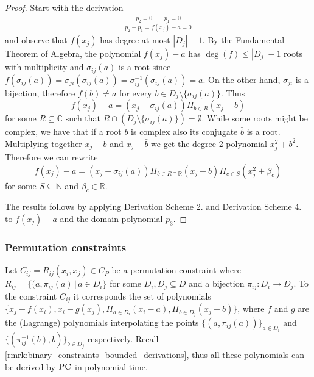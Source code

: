 \documentclass[11pt]{article}
\newcommand{\PC}{\textsc{PC}}
\newcommand{\1}{\textbf{1}}
\begin{document}
\begin{proof}
    Start with the derivation
    \begin{align*}
        \frac{p_2 = 0 \qquad  p_1 = 0}{p_2 - p_1 = f(x_j) - a = 0}
    \end{align*}
    and observe that $f(x_j)$ has degree at most $|D_j| - 1$. By the Fundamental Theorem of Algebra, the polynomial $f(x_j) - a$ has $\deg(f) \leq |D_j| - 1$ roots with multiplicity and $\sigma_{ij}(a)$ is a root since $f(\sigma_{ij}(a)) = \sigma_{ji}(\sigma_{ij}(a)) = \sigma_{ij}^{-1}(\sigma_{ij}(a)) = a$. On the other hand, $\sigma_{ji}$ is a bijection, therefore $f(b) \neq a$ for every $b \in D_j \setminus \{\sigma_{ij}(a)\}$. Thus
    \begin{equation*}
        f(x_j) - a = (x_j - \sigma_{ij}(a))\Pi_{b \in R}(x_j - b)
    \end{equation*}
    for some $R \subseteq \mathbb{C}$ such that $R \cap \left( D_j \setminus \{ \sigma_{ij}(a) \} \right) = \emptyset$. While some roots might be complex, we have that if a root $b$ is complex also its conjugate $\bar{b}$ is a root. Multiplying together $x_j - b$ and $x_j - \bar{b}$ we get the degree 2 polynomial $x_j^2 + b^2$. Therefore we can rewrite
    \begin{equation*}
        f(x_j) - a = (x_j - \sigma_{ij}(a))\Pi_{b \in R\cap \mathbb{R}}(x_j - b) \Pi_{c \in S} (x_j^2 + \beta_c)
    \end{equation*}
    for some $S \subseteq \mathbb{N}$ and $\beta_c \in \mathbb{R}$.

    The results follows by applying Derivation Scheme 2. and Derivation Scheme 4. to $f(x_j) - a$ and the domain polynomial $p_3$.
\end{proof}

\subsubsection{Permutation constraints}\label{sect:permutation_constraints}

Let $C_{ij} = R_{ij}(x_i,x_j) \in C_P$ be a permutation constraint where $R_{ij} = \{(a, \pi_{ij}(a) \, | \, a \in D_i \}$ for some $D_i,D_j \subseteq D$ and a bijection $\pi_{ij}:D_i \rightarrow D_j$. To the constraint $C_{ij}$ it corresponds the set of polynomials $\{ x_j - f(x_i), x_i - g(x_j), \Pi_{a \in D_i} (x_i - a), \Pi_{b \in D_j}(x_j - b)\}$, where $f$ and $g$ are the (Lagrange) polynomials interpolating the points $\{(a,\pi_{ij}(a))\}_{a \in D_i}$ and $\{(\pi_{ij}^{-1}(b),b)\}_{b \in D_j}$ respectively. Recall \cref{rmrk:binary_constraints_bounded_derivations}, thus all these polynomials can be derived by $\PC$ in polynomial time.
\end{document}
